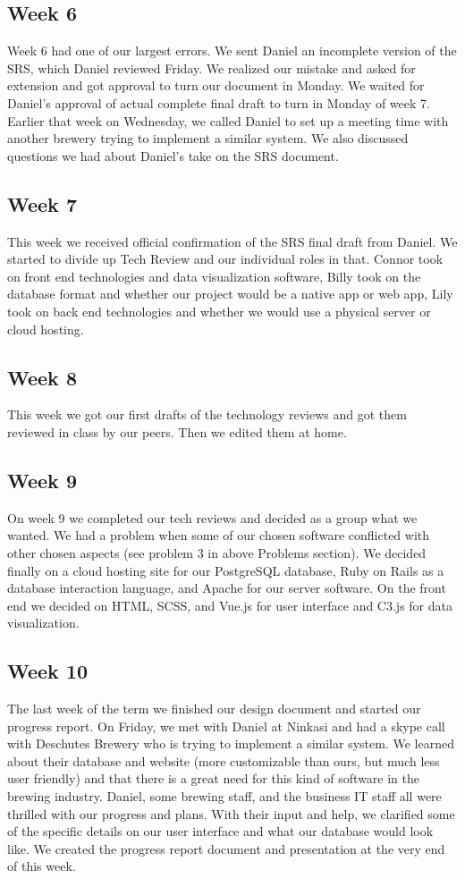 \documentclass[draftclsnofoot,onecolumn,letterpaper,10pt,compsoc]{IEEEtran}
\begin{document}
\subsection{Week 6}
Week 6 had one of our largest errors.
We sent Daniel an incomplete version of the SRS, which Daniel reviewed Friday.
We realized our mistake and asked for extension and got approval to turn our document in Monday.
We waited for Daniel’s approval of actual complete final draft to turn in Monday of week 7.
Earlier that week on Wednesday, we called Daniel to set up a meeting time with another brewery trying to implement a similar system.
We also discussed questions we had about Daniel’s take on the SRS document.
\subsection{Week 7}
This week we received official confirmation of the SRS final draft from Daniel.
We started to divide up Tech Review and our individual roles in that.
Connor took on front end  technologies and data visualization software, Billy took on the database format and whether our project would be a native app or web app, Lily took on back end technologies and whether we would use a physical server or cloud hosting.
\subsection{Week 8}
This week we got our first drafts of the technology reviews and got them reviewed in class by our peers.
Then we edited them at home.
\subsection{Week 9}
On week 9 we completed our tech reviews and decided as a group what we wanted.
We had a problem when some of our chosen software conflicted with other chosen aspects (see problem 3 in above Problems section).
We decided finally on a cloud hosting site for our PostgreSQL database, Ruby on Rails as a database interaction language, and Apache for our server software.
On the front end we decided on HTML, SCSS, and Vue.js for user interface and C3.js for data visualization.
\subsection{Week 10}
The last week of the term we finished our design document and started our progress report.
On Friday, we met with Daniel at Ninkasi and had a skype call with Deschutes Brewery who is trying to implement a similar system.
We learned about their database and website (more customizable than ours, but much less user friendly) and that there is a great need for this kind of software in the brewing industry.
Daniel, some brewing staff, and the business IT staff all were thrilled with our progress and plans.
With their input and help, we clarified some of the specific details on our user interface and what our database would look like.
We created the progress report document and presentation at the very end of this week.
\end{document}
